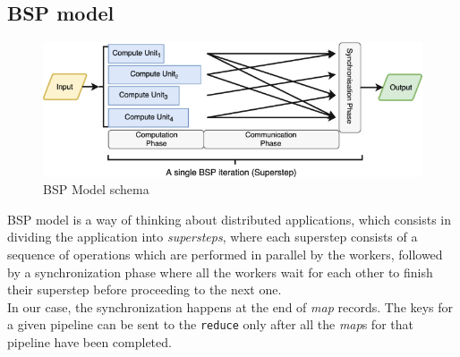 \subsection{BSP model}
\begin{figure}[htbp]
   \centering
   \includegraphics{images/bspmodel.png}
   \caption{BSP Model schema}
   \label{fig:bspmodel}
\end{figure}
BSP model is a way of thinking about distributed applications, which consists in dividing the application into \textit{supersteps}, where each superstep consists of a sequence of operations which are performed in parallel by the workers, followed by a synchronization phase where all the workers wait for each other to finish their superstep before proceeding to the next one.\\
In our case, the synchronization happens at the end of \textit{map} records. The keys for a given pipeline can be sent to the \texttt{reduce} only after all the \textit{map}s for that pipeline have been completed.

